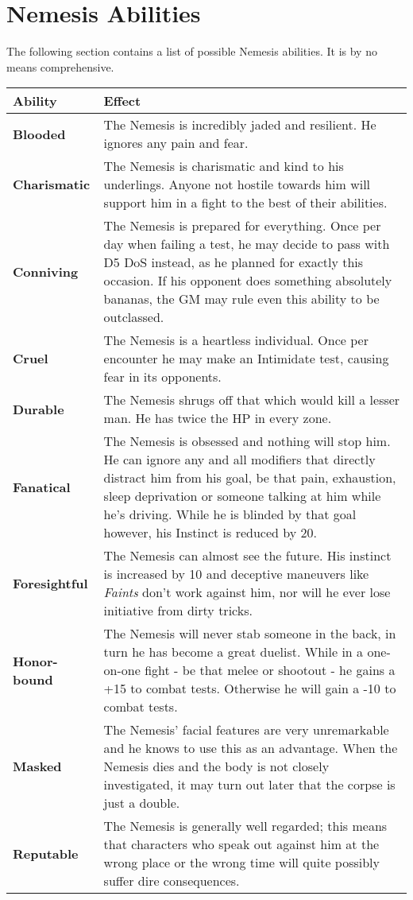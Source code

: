 \documentclass[12pt,a4paper,openany,usenames,dvipsnames]{book}
\begin{document}
	\section*{Nemesis Abilities}
	The following section contains a list of possible Nemesis abilities. It is by no means comprehensive.\\
	{\setlength{\extrarowheight}{5pt}
	\begin{tabularx}{\textwidth}{l|X}
		Ability & Effect\\
		\hline
		\textbf{Blooded} & The Nemesis is incredibly jaded and resilient. He ignores any pain and fear.\\
		\hline
		\textbf{Charismatic} & The Nemesis is charismatic and kind to his underlings. Anyone not hostile towards him will support him in a fight to the best of their abilities.\\
		\hline
		\textbf{Conniving} & The Nemesis is prepared for everything. Once per day when failing a test, he may decide to pass with D5 DoS instead, as he planned for exactly this occasion. If his opponent does something absolutely bananas, the GM may rule even this ability to be outclassed.\\
		\hline
		\textbf{Cruel} & The Nemesis is a heartless individual. Once per encounter he may make an Intimidate test, causing fear in its opponents.\\
		\hline
		\textbf{Durable} & The Nemesis shrugs off that which would kill a lesser man. He has twice the HP in every zone.\\
		\hline
		\textbf{Fanatical} & The Nemesis is obsessed and nothing will stop him. He can ignore any and all modifiers that directly distract him from his goal, be that pain, exhaustion, sleep deprivation or someone talking at him while he's driving. While he is blinded by that goal however, his Instinct is reduced by 20.\\
		\hline
		\textbf{Foresightful} & The Nemesis can almost see the future. His instinct is increased by 10 and deceptive maneuvers like \emph{Faints} don't work against him, nor will he ever lose initiative from dirty tricks.\\
		\hline
		\textbf{Honor-bound} & The Nemesis will never stab someone in the back, in turn he has become a great duelist. While in a one-on-one fight - be that melee or shootout - he gains a +15 to combat tests. Otherwise he will gain a -10 to combat tests.\\
		\hline
		\textbf{Masked} & The Nemesis' facial features are very unremarkable and he knows to use this as an advantage. When the Nemesis dies and the body is not closely investigated, it may turn out later that the corpse is just a double.\\
		\hline
		\textbf{Reputable} & The Nemesis is generally well regarded; this means that characters who speak out against him at the wrong place or the wrong time will quite possibly suffer dire consequences.
	\end{tabularx}}
	
\end{document}

